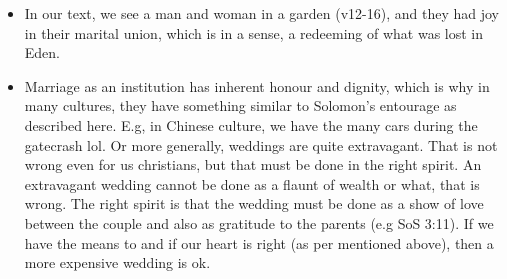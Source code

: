 \begin{itemize}
  \item{In our text, we see a man and woman in a garden (v12-16), and they had joy in their marital union, which is in a sense, a redeeming of what was lost in Eden.}
  \item{Marriage as an institution has inherent honour and dignity, which is why in many cultures, they have something similar to Solomon’s entourage as described here. E.g, in Chinese culture, we have the many cars during the gatecrash lol. Or more generally, weddings are quite extravagant. That is not wrong even for us christians, but that must be done in the right spirit. An extravagant wedding cannot be done as a flaunt of wealth or what, that is wrong. The right spirit is that the wedding must be done as a show of love between the couple and also as gratitude to the parents (e.g SoS 3:11). If we have the means to and if our heart is right (as per mentioned above), then a more expensive wedding is ok. }
\end{itemize}